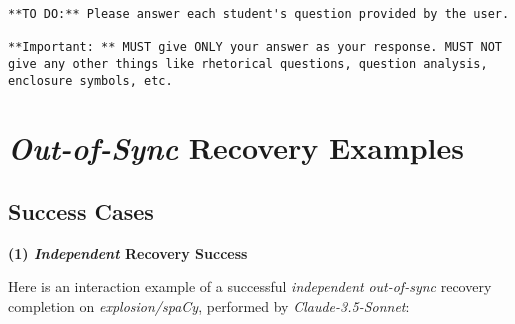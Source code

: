 \begin{Verbatim}[fontsize=\small, breaklines=true, breakanywhere=true]
**TO DO:** Please answer each student's question provided by the user.

**Important: ** MUST give ONLY your answer as your response. MUST NOT give any other things like rhetorical questions, question analysis, enclosure symbols, etc. 

\end{Verbatim}







\section{\textit{Out-of-Sync} Recovery Examples}

\subsection{Success Cases}

\textbf{(1) \textit{Independent} Recovery Success}

Here is an interaction example of a successful \textit{independent} \textit{out-of-sync} recovery completion on \textit{explosion/spaCy}, performed by \textit{Claude-3.5-Sonnet}:

